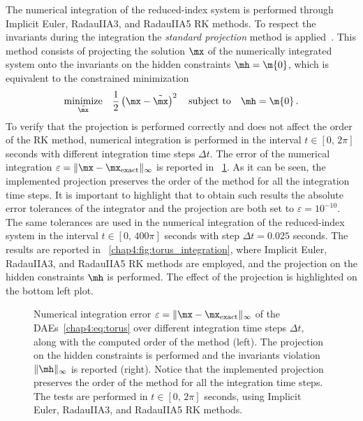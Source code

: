 The numerical integration of the reduced-index system is performed through Implicit Euler, RadauIIA3, and RadauIIA5 \ac{RK} methods. To respect the invariants during the integration the \emph{standard projection} method is applied~\cite{hairer2000symmetric}. This method consists of projecting the solution $\mx$ of the numerically integrated system onto the invariants on the hidden constraints $\mh = \m{0}$, which is equivalent to the constrained minimization
%
\begin{equation*}
  \underset{\tilde{\mx}}{\textrm{minimize}} \quad \dfrac{1}{2}\left(\mx - \tilde{\mx}\right)^2
    \quad \textrm{subject to} \quad
    \mh = \m{0} \, \text{.}
\end{equation*}
%
To verify that the projection is performed correctly and does not affect the order of the \ac{RK} method, numerical integration is performed in the interval $t \in [0, \, 2\pi]$ seconds with different integration time steps $\Delta t$. The error of the numerical integration $\varepsilon = \| \mx - \mx_\text{exact} \|_{\infty}$ is reported in \figurename~\ref{chap4:fig:torus_order}. As it can be seen, the implemented projection preserves the order of the method for all the integration time steps. It is important to highlight that to obtain such results the absolute error tolerances of the integrator and the projection are both set to $\varepsilon = 10^{-10}$. The same tolerances are used in the numerical integration of the reduced-index system in the interval $t \in [0, \, 400\pi]$ seconds with step $\Delta t = 0.025$ seconds. The results are reported in \figurename~\ref{chap4:fig:torus_integration}, where Implicit Euler, RadauIIA3, and RadauIIA5 \ac{RK} methods are employed, and the projection on the hidden constraints $\mh$ is performed. The effect of the projection is highlighted on the bottom left plot.

\begin{figure}[htb]
  \centering
  \small{}
  \caption{Numerical integration error $\varepsilon = \| \mx - \mx_\text{exact} \|_{\infty}$ of the \acp{DAE}~\eqref{chap4:eq:torus} over different integration time steps $\Delta t$, along with the computed order of the method (left). The projection on the hidden constraints is performed and the invariants violation $\| \mh \|_{\infty}$ is reported (right). Notice that the implemented projection preserves the order of the method for all the integration time steps. The tests are performed in $t \in [0, \, 2\pi]$ seconds, using Implicit Euler, RadauIIA3, and RadauIIA5 \ac{RK} methods.}
  \label{chap4:fig:torus_order}
\end{figure}

